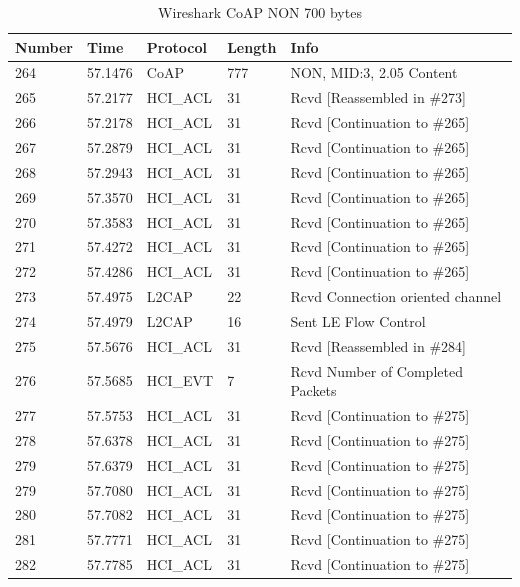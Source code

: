 \begin{table}[ht]
\centering
\caption{Wireshark CoAP NON 700 bytes}
\label{coapNON700table}
\begin{tabular}{lllll}
\hline
Number & Time    & Protocol & Length & Info                             \\ \hline
264    & 57.1476 & CoAP     & 777    & NON, MID:3, 2.05 Content         \\
265    & 57.2177 & HCI\_ACL & 31     & Rcvd {[}Reassembled in \#273{]}  \\
266    & 57.2178 & HCI\_ACL & 31     & Rcvd {[}Continuation to \#265{]} \\
267    & 57.2879 & HCI\_ACL & 31     & Rcvd {[}Continuation to \#265{]} \\
268    & 57.2943 & HCI\_ACL & 31     & Rcvd {[}Continuation to \#265{]} \\
269    & 57.3570 & HCI\_ACL & 31     & Rcvd {[}Continuation to \#265{]} \\
270    & 57.3583 & HCI\_ACL & 31     & Rcvd {[}Continuation to \#265{]} \\
271    & 57.4272 & HCI\_ACL & 31     & Rcvd {[}Continuation to \#265{]} \\
272    & 57.4286 & HCI\_ACL & 31     & Rcvd {[}Continuation to \#265{]} \\
273    & 57.4975 & L2CAP    & 22     & Rcvd Connection oriented channel \\
274    & 57.4979 & L2CAP    & 16     & Sent LE Flow Control             \\
275    & 57.5676 & HCI\_ACL & 31     & Rcvd {[}Reassembled in \#284{]}  \\
276    & 57.5685 & HCI\_EVT & 7      & Rcvd Number of Completed Packets \\
277    & 57.5753 & HCI\_ACL & 31     & Rcvd {[}Continuation to \#275{]} \\
278    & 57.6378 & HCI\_ACL & 31     & Rcvd {[}Continuation to \#275{]} \\
279    & 57.6379 & HCI\_ACL & 31     & Rcvd {[}Continuation to \#275{]} \\
279    & 57.7080 & HCI\_ACL & 31     & Rcvd {[}Continuation to \#275{]} \\
280    & 57.7082 & HCI\_ACL & 31     & Rcvd {[}Continuation to \#275{]} \\
281    & 57.7771 & HCI\_ACL & 31     & Rcvd {[}Continuation to \#275{]} \\
282    & 57.7785 & HCI\_ACL & 31     & Rcvd {[}Continuation to \#275{]} \\

\end{tabular}
\end{table}
